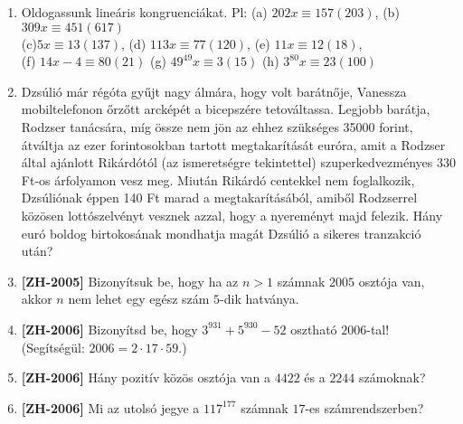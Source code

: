 \documentclass[a4paper, 12pt]{article}
\begin{document}
\begin{enumerate}
	\item Oldogassunk lineáris kongruenciákat. Pl:
(a) $202x\equiv 157(203)$,
\hfil
(b) $309x\equiv 451(617)$
\\
(c)$5x\equiv 13 (137)$,
\hfil
(d) $113x\equiv 77 (120)$,
\hfil
(e) $11x\equiv 12(18)$, 
\\
(f) $14x-4\equiv 80(21)$
\hfil
(g) $49^{49}x\equiv3(15)$
\hfil 
(h) $3^{80}x\equiv 23(100)$
	\item Dzsúlió már régóta gyűjt nagy álmára, hogy volt barátnője, Vanessza mobiltelefonon őrzőtt arcképét a bicepszére tetováltassa. Legjobb barátja, Rodzser tanácsára, míg össze nem jön az ehhez szükséges 35000 forint, átváltja az ezer forintosokban tartott megtakarítását euróra, amit a Rodzser által ajánlott Rikárdótól (az ismeretségre tekintettel) szuperkedvezményes 330 Ft-os árfolyamon vesz meg. Miután Rikárdó centekkel nem foglalkozik, Dzsúliónak éppen 140 Ft marad a megtakarításából, amiből Rodzserrel közösen lottószelvényt vesznek azzal, hogy a nyereményt majd felezik. Hány euró boldog birtokosának mondhatja magát Dzsúlió a sikeres tranzakció után?
	\item \textbf{[ZH-2005]} Bizonyítsuk be, hogy ha az $n>1$ számnak $2005$ osztója van, akkor $n$ nem lehet egy egész szám $5$-dik hatványa.
	\item \textbf{[ZH-2006]} Bizonyítsd be, hogy $3^{931}+5^{930}-52$ osztható $2006$-tal! (Segítségül: $2006=2\cdot 17 \cdot 59$.)
	\item \textbf{[ZH-2006]} Hány pozitív közös osztója van a $4422$ és a $2244$ számoknak?
	\item \textbf{[ZH-2006]} Mi az utolsó jegye a $117^{177}$ számnak $17$-es számrendszerben?

\end{enumerate}
\end{document}

